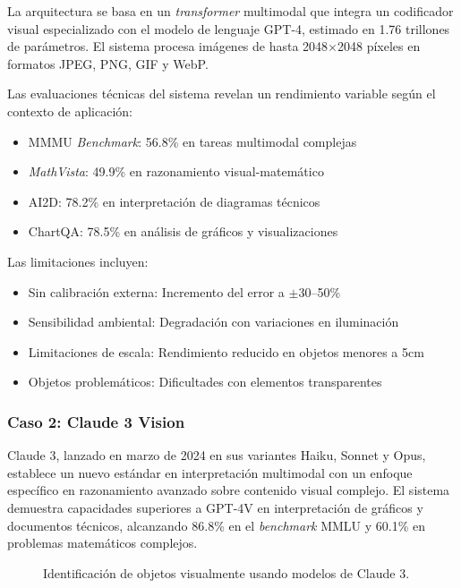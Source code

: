 La arquitectura se basa en un \textit{transformer} multimodal que integra un codificador visual especializado con el modelo de lenguaje GPT-4, estimado en 1.76 trillones de parámetros. El sistema procesa imágenes de hasta 2048$\times$2048 píxeles en formatos JPEG, PNG, GIF y WebP.

Las evaluaciones técnicas del sistema revelan un rendimiento variable según el contexto de aplicación:

\begin{itemize}
    \item MMMU \textit{Benchmark}: 56.8\% en tareas multimodal complejas
    \item \textit{MathVista}: 49.9\% en razonamiento visual-matemático
    \item AI2D: 78.2\% en interpretación de diagramas técnicos
    \item ChartQA: 78.5\% en análisis de gráficos y visualizaciones
\end{itemize}

Las limitaciones incluyen:
\begin{itemize}
    \item Sin calibración externa: Incremento del error a $\pm$30--50\%
    \item Sensibilidad ambiental: Degradación con variaciones en iluminación
    \item Limitaciones de escala: Rendimiento reducido en objetos menores a 5cm
    \item Objetos problemáticos: Dificultades con elementos transparentes
\end{itemize}

\subsubsection{Caso 2: Claude 3 Vision}

Claude 3, lanzado en marzo de 2024 en sus variantes Haiku, Sonnet y Opus, establece un nuevo estándar en interpretación multimodal con un enfoque específico en razonamiento avanzado sobre contenido visual complejo. El sistema demuestra capacidades superiores a GPT-4V en interpretación de gráficos y documentos técnicos, alcanzando 86.8\% en el \textit{benchmark} MMLU y 60.1\% en problemas matemáticos complejos.

\begin{figure}[H]
    \centering
    \caption{Identificación de objetos visualmente usando modelos de Claude 3.}
    \label{fig:claude3_detection}
\end{figure}

